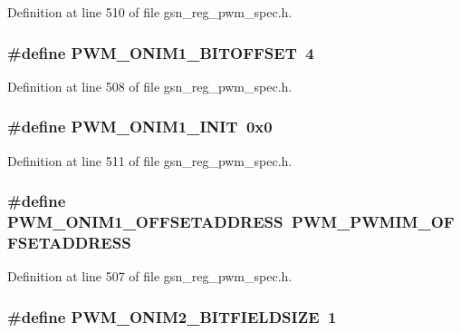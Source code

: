 Definition at line 510 of file gsn\_\-reg\_\-pwm\_\-spec.h.

\hypertarget{a00565_a7f08790e34410dfd96c9874b33f18602}{
\subsubsection[{PWM\_\-ONIM1\_\-BITOFFSET}]{\setlength{\rightskip}{0pt plus 5cm}\#define PWM\_\-ONIM1\_\-BITOFFSET~4}}
\label{a00565_a7f08790e34410dfd96c9874b33f18602}


Definition at line 508 of file gsn\_\-reg\_\-pwm\_\-spec.h.

\hypertarget{a00565_ab8730bf4f51dc9a83599cf86d88ed63f}{
\subsubsection[{PWM\_\-ONIM1\_\-INIT}]{\setlength{\rightskip}{0pt plus 5cm}\#define PWM\_\-ONIM1\_\-INIT~0x0}}
\label{a00565_ab8730bf4f51dc9a83599cf86d88ed63f}


Definition at line 511 of file gsn\_\-reg\_\-pwm\_\-spec.h.

\hypertarget{a00565_ab7cd5ba873031bd3d4bb8a7b173a8f6b}{
\subsubsection[{PWM\_\-ONIM1\_\-OFFSETADDRESS}]{\setlength{\rightskip}{0pt plus 5cm}\#define PWM\_\-ONIM1\_\-OFFSETADDRESS~PWM\_\-PWMIM\_\-OFFSETADDRESS}}
\label{a00565_ab7cd5ba873031bd3d4bb8a7b173a8f6b}


Definition at line 507 of file gsn\_\-reg\_\-pwm\_\-spec.h.

\hypertarget{a00565_a4627793b4810f33e028618e974dab71d}{
\subsubsection[{PWM\_\-ONIM2\_\-BITFIELDSIZE}]{\setlength{\rightskip}{0pt plus 5cm}\#define PWM\_\-ONIM2\_\-BITFIELDSIZE~1}}
\label{a00565_a4627793b4810f33e028618e974dab71d}



